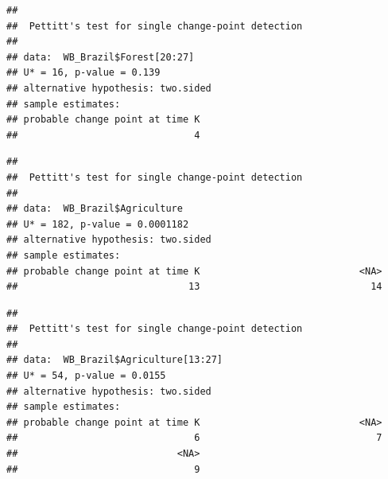 \documentclass[12pt,]{article}
\newenvironment{Shaded}{\begin{snugshade}}{\end{snugshade}}
\newcommand{\KeywordTok}[1]{\textcolor[rgb]{0.13,0.29,0.53}{\textbf{#1}}}
\newcommand{\DecValTok}[1]{\textcolor[rgb]{0.00,0.00,0.81}{#1}}
\newcommand{\CommentTok}[1]{\textcolor[rgb]{0.56,0.35,0.01}{\textit{#1}}}
\newcommand{\OperatorTok}[1]{\textcolor[rgb]{0.81,0.36,0.00}{\textbf{#1}}}
\newcommand{\NormalTok}[1]{#1}
\begin{document}
\begin{verbatim}
## 
##  Pettitt's test for single change-point detection
## 
## data:  WB_Brazil$Forest[20:27]
## U* = 16, p-value = 0.139
## alternative hypothesis: two.sided
## sample estimates:
## probable change point at time K 
##                               4
\end{verbatim}

\begin{Shaded}
\end{Shaded}

\begin{verbatim}
## 
##  Pettitt's test for single change-point detection
## 
## data:  WB_Brazil$Agriculture
## U* = 182, p-value = 0.0001182
## alternative hypothesis: two.sided
## sample estimates:
## probable change point at time K                            <NA> 
##                              13                              14
\end{verbatim}

\begin{Shaded}
\end{Shaded}

\begin{verbatim}
## 
##  Pettitt's test for single change-point detection
## 
## data:  WB_Brazil$Agriculture[13:27]
## U* = 54, p-value = 0.0155
## alternative hypothesis: two.sided
## sample estimates:
## probable change point at time K                            <NA> 
##                               6                               7 
##                            <NA> 
##                               9
\end{verbatim}

\begin{Shaded}
\end{Shaded}
\end{document}
